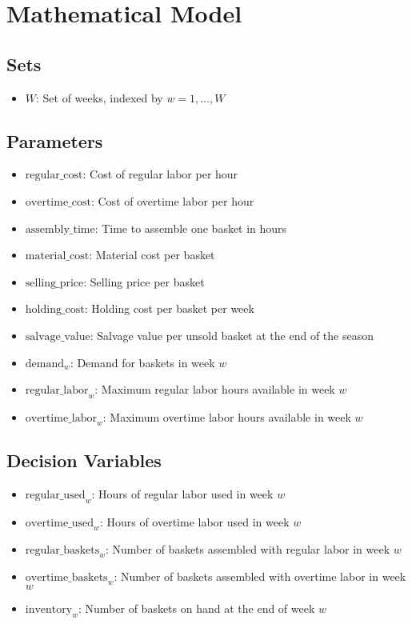 \documentclass{article}
\begin{document}
\section*{Mathematical Model}

\subsection*{Sets}
\begin{itemize}
    \item \( W \): Set of weeks, indexed by \( w = 1, \ldots, W \)
\end{itemize}

\subsection*{Parameters}
\begin{itemize}
    \item \( \text{regular\_cost} \): Cost of regular labor per hour
    \item \( \text{overtime\_cost} \): Cost of overtime labor per hour
    \item \( \text{assembly\_time} \): Time to assemble one basket in hours
    \item \( \text{material\_cost} \): Material cost per basket
    \item \( \text{selling\_price} \): Selling price per basket
    \item \( \text{holding\_cost} \): Holding cost per basket per week
    \item \( \text{salvage\_value} \): Salvage value per unsold basket at the end of the season
    \item \( \text{demand}_w \): Demand for baskets in week \( w \)
    \item \( \text{regular\_labor}_w \): Maximum regular labor hours available in week \( w \)
    \item \( \text{overtime\_labor}_w \): Maximum overtime labor hours available in week \( w \)
\end{itemize}

\subsection*{Decision Variables}
\begin{itemize}
    \item \( \text{regular\_used}_w \): Hours of regular labor used in week \( w \)
    \item \( \text{overtime\_used}_w \): Hours of overtime labor used in week \( w \)
    \item \( \text{regular\_baskets}_w \): Number of baskets assembled with regular labor in week \( w \)
    \item \( \text{overtime\_baskets}_w \): Number of baskets assembled with overtime labor in week \( w \)
    \item \( \text{inventory}_w \): Number of baskets on hand at the end of week \( w \)
\end{itemize}
\end{document}
